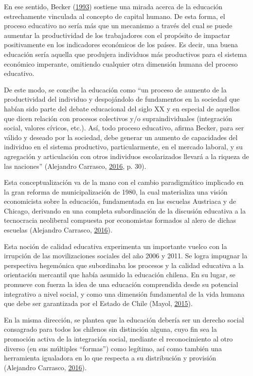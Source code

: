 \documentclass[
]{article}
\begin{document}
En ese sentido, Becker (\protect\hyperlink{ref-becker_human_1993}{1993})
sostiene una mirada acerca de la educación estrechamente vinculada al
concepto de capital humano. De esta forma, el proceso educativo no sería
más que un mecanismo a través del cual se puede aumentar la
productividad de los trabajadores con el propósito de impactar
positivamente en los indicadores económicos de los países. Es decir, una
buena educación sería aquella que produjera individuos más productivos
para el sistema económico imperante, omitiendo cualquier otra dimensión
humana del proceso educativo.

De este modo, se concibe la educación como ``un proceso de aumento de la
productividad del individuo y despojándolo de fundamentos en la sociedad
que habían sido parte del debate educacional del siglo XX y en especial
de aquellos que dicen relación con procesos colectivos y/o
supraindividuales (integración social, valores cívicos, etc.). Así, todo
proceso educativo, afirma Becker, para ser válido y deseado por la
sociedad, debe generar un aumento de capacidades del individuo en el
sistema productivo, particularmente, en el mercado laboral, y su
agregación y articulación con otros individuos escolarizados llevará a
la riqueza de las naciones'' (Alejandro Carrasco,
\protect\hyperlink{ref-alejandrocarrasco_mercado_2016}{2016}, p. 30).

Esta conceptualización va de la mano con el cambio paradigmático
implicado en la gran reforma de municipalización de 1980, la cual
materializa una visión economicista sobre la educación, fundamentada en
las escuelas Austriaca y de Chicago, derivando en una completa
subordinación de la discusión educativa a la tecnocracia neoliberal
compuesta por economistas formados al alero de dichas escuelas
(Alejandro Carrasco,
\protect\hyperlink{ref-alejandrocarrasco_mercado_2016}{2016}).

Esta noción de calidad educativa experimenta un importante vuelco con la
irrupción de las movilizaciones sociales del año 2006 y 2011. Se logra
impugnar la perspectiva hegemónica que subordinaba los procesos y la
calidad educativa a la orientación mercantil que había asumido la
educación chilena. En su lugar, se promueve con fuerza la idea de una
educación comprendida desde su potencial integrativo a nivel social, y
como una dimensión fundamental de la vida humana que debe ser
garantizada por el Estado de Chile (Mayol,
\protect\hyperlink{ref-mayol_derrumbe_2015}{2015}).

En la misma dirección, se plantea que la educación debería ser un
derecho social consagrado para todos los chilenos sin distinción alguna,
cuyo fin sea la promoción activa de la integración social, mediante el
reconocimiento al otro diverso (en sus múltiples ``formas'') como
legítimo, así como también una herramienta igualadora en lo que respecta
a su distribución y provisión (Alejandro Carrasco,
\protect\hyperlink{ref-alejandrocarrasco_mercado_2016}{2016}).
\end{document}
